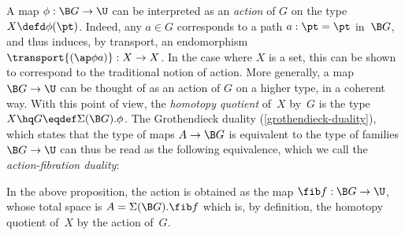 \documentclass[a4paper]{article}
\begin{document}
A map $\phi:\B G\to\U$ can be interpreted as an \emph{action} of $G$ on the type~$X\defd\phi(\pt)$. Indeed, any $a\in G$ corresponds to a path $a:\pt=\pt$ in~$\B G$, and thus induces, by transport, an endomorphism $\transport{(\ap\phi a)}:X\to X$. In the case where $X$ is a set, this can be shown to correspond to the traditional notion of action. More generally, a map $\B G\to\U$ can be thought of as an action of $G$ on a higher type, in a coherent way. With this point of view, the \emph{homotopy quotient} of~$X$ by~$G$ is the type $X\hq G\eqdef\Sigma(\B G).\phi$. The Grothendieck duality (\cref{grothendieck-duality}), which states that the type of maps $A\to\B G$ is equivalent to the type of families $\B G\to\U$ can thus be read as the following equivalence, which we call the \emph{action-fibration duality}:


\noindent
In the above proposition, the action is obtained as the map $\fib f:\B G\to\U$, whose total space is $A=\Sigma(\B G).\fib f$ which is, by definition, the homotopy quotient of~$X$ by the action of~$G$.
\end{document}
